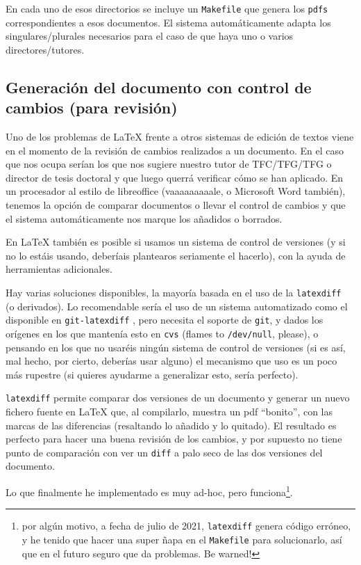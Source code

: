 \documentclass[spanish,openright]{book}
\begin{document}
En cada uno de esos directorios se incluye un \texttt{Makefile} que
genera los \texttt{pdfs} correspondientes a esos documentos. El
sistema automáticamente adapta los singulares/plurales necesarios para
el caso de que haya uno o varios directores/tutores.


\subsection{Generación del documento con control de cambios (para
revisión)}
\label{sec:control-de-cambios}

Uno de los problemas de \LaTeX{} frente a otros sistemas de edición de
textos viene en el momento de la revisión de cambios realizados a un
documento. En el caso que nos ocupa serían los que nos sugiere nuestro
tutor de TFC/TFG/TFG o director de tesis doctoral y que luego querrá
verificar cómo se han aplicado. En un procesador al estilo de
libreoffice (vaaaaaaaaale, o Microsoft Word también), tenemos la opción
de comparar documentos o llevar el control de cambios y que el sistema
automáticamente nos marque los añadidos o borrados.

En \LaTeX{} también es posible si usamos un sistema de control de
versiones (y si no lo estáis usando, deberíais plantearos seriamente el
hacerlo), con la ayuda de herramientas adicionales.

Hay varias soluciones disponibles, la mayoría basada en el uso de la
\texttt{latexdiff}~\cite{latexdiff} (o derivados). Lo recomendable
sería el uso de un sistema automatizado como el disponible en
\texttt{git-latexdiff} \cite{git-latexdiff}, pero necesita el soporte
de \texttt{git}, y dados los orígenes en los que mantenía esto en
\texttt{cvs} (flames to \texttt{/dev/null}, please), o pensando en los
que no usaréis ningún sistema de control de versiones (si es así, mal
hecho, por cierto, deberías usar alguno) el mecanismo que uso es un
poco más rupestre (si quieres ayudarme a generalizar esto, sería
perfecto).

\texttt{latexdiff} permite comparar dos versiones de un documento y
generar un nuevo fichero fuente en \LaTeX{} que, al compilarlo, muestra un
pdf  ``bonito'', con las marcas de las diferencias (resaltando lo añadido
y lo quitado). El resultado es perfecto para hacer una buena revisión de
los cambios, y por supuesto no tiene punto de comparación con ver un
\texttt{diff} a palo seco de las dos versiones del documento.

Lo que finalmente he implementado es muy ad-hoc, pero
funciona\footnote{por algún motivo, a fecha de julio de 2021,
\texttt{latexdiff} genera código erróneo, y he tenido que hacer una
super ñapa en el \texttt{Makefile} para solucionarlo, así que en el
futuro seguro que da problemas. Be warned!}.
\end{document}
